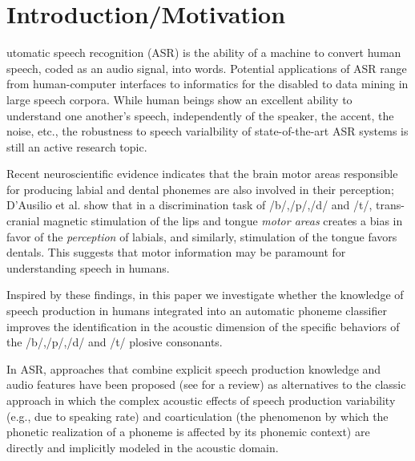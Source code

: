 \section{Introduction/Motivation}
\label{sec:intro}

utomatic speech recognition (ASR) is the ability of a machine
to convert human speech, coded as an audio signal, into words.
Potential applications of ASR range from human-computer interfaces
to informatics for the disabled to data mining in large speech corpora.
While human beings show an excellent ability to understand one another's speech,
 independently of the speaker, the accent, the noise, etc., the robustness to speech varialbility
of state-of-the-art ASR systems is still an active research topic.

Recent neuroscientific evidence indicates that the brain motor areas responsible for producing labial
and dental phonemes are also involved in their perception; D'Ausilio et al. \cite{dausilio}
show that in a discrimination task of /b/,/p/,/d/ and /t/, trans-cranial magnetic
stimulation of the lips and tongue \emph{motor areas} creates a bias in favor
of the \emph{perception} of labials, and similarly, stimulation of the tongue
favors dentals. This suggests that motor information may be paramount for
understanding speech in humans.

Inspired by these findings, in this paper we investigate whether the knowledge of speech production in humans 
integrated into an automatic phoneme classifier improves the identification in the acoustic dimension 
of the specific behaviors of the /b/,/p/,/d/ and /t/ plosive consonants.
 
In ASR, approaches that combine explicit speech production knowledge and audio features
have been proposed (see \cite{king} for a review) as alternatives 
to the classic approach  in which the complex acoustic effects of speech production variability 
(e.g., due to speaking rate) and coarticulation (the phenomenon by which the phonetic realization of a phoneme is affected by its phonemic context) are directly and implicitly modeled in the acoustic domain.

